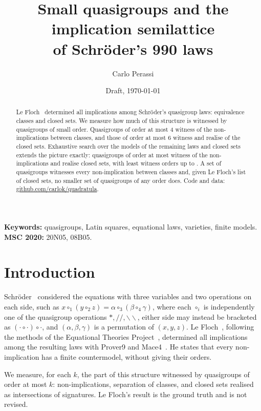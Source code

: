 \documentclass[11pt,a4paper]{article}
\title{Small quasigroups and the implication semilattice\\ of Schröder's 990 laws}
\author{Carlo Perassi}
\date{Draft, \today}
\newcommand{\ldiv}{\mathbin{/\!/}}
\newcommand{\rdiv}{\mathbin{\backslash\!\backslash}}
\theoremstyle{definition}
\begin{document}
\maketitle

\begin{abstract}
Le Floch~\cite{lefloch} determined all implications among Schröder's \NLaws{}
quasigroup laws: \NClasses{} equivalence classes and \NVarieties{} closed sets. We
measure how much of this structure is witnessed by quasigroups of small order.
Quasigroups of order at most 4 witness \ClassSatFour{} of the non-implications
between classes, and those of order at most 6 witness \ClassSatSix{} and realise
\VarSix{} of the \NVarieties{} closed sets. Exhaustive search over the models of the
remaining laws and closed sets extends the picture exactly: quasigroups of order at
most \CompleteUpTo{} witness \ClassSatNine{} of the non-implications and realise
\VarNine{} closed sets, with least witness orders up to \WitTwentyThree. A set of
\FullCover{} quasigroups witnesses every non-implication between classes and, given
Le Floch's list of closed sets, no smaller set of quasigroups of any order does.
Code and data: \href{https://github.com/carlok/quadratula}{github.com/carlok/quadratula}.
\end{abstract}

\noindent\textbf{Keywords:} quasigroups, Latin squares, equational laws, varieties,
finite models.\\
\textbf{MSC 2020:} 20N05, 08B05.

\section{Introduction}

Schröder~\cite{schroeder} considered the equations with three variables and two
operations on each side, such as $x \circ_1 (y \circ_2 z) = \alpha \circ_3 (\beta
\circ_4 \gamma)$, where each $\circ_i$ is independently one of the quasigroup
operations $*, \ldiv, \rdiv$, either side may instead be bracketed as
$(\cdot \circ \cdot) \circ \cdot$, and $(\alpha,\beta,\gamma)$ is a permutation of
$(x,y,z)$. Le Floch~\cite{lefloch}, following the methods of the Equational Theories
Project~\cite{etp}, determined all implications among the resulting \NLaws{} laws
with Prover9 and Mace4~\cite{mccune}. He states that every non-implication has a
finite countermodel, without giving their orders.

We measure, for each $k$, the part of this structure witnessed by quasigroups of
order at most $k$: non-implications, separation of classes, and closed sets
realised as intersections of signatures. Le Floch's result is the ground truth and
is not revised.
\end{document}
